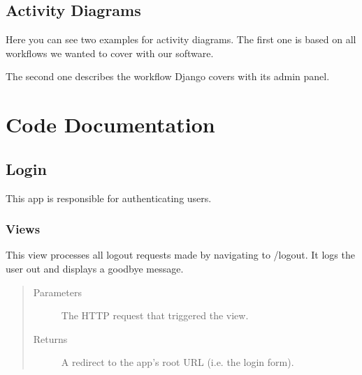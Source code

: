 \documentclass[letterpaper,10pt,english]{sphinxmanual}
\begin{document}


\section{Activity Diagrams}
\label{\detokenize{masterDeveloperDoc:activity-diagrams}}
Here you can see two examples for activity diagrams. The first one is based
on all workflows we wanted to cover with our software.


The second one describes the workflow Django covers with its admin panel.



\chapter{Code Documentation}
\label{\detokenize{masterCodeDoc:code-documentation}}\label{\detokenize{masterCodeDoc::doc}}

\section{Login}
\label{\detokenize{masterCodeDoc:login}}
This app is responsible for authenticating users.


\subsection{Views}
\label{\detokenize{masterCodeDoc:module-login.views}}\label{\detokenize{masterCodeDoc:views}}

\begin{fulllineitems}
\label{\detokenize{masterCodeDoc:login.views.logout_request}}
This view processes all logout requests made by navigating to /logout. It logs the user out and displays a goodbye message.
\begin{quote}\begin{description}
\item[{Parameters}] \leavevmode
{} \textendash{} The HTTP request that triggered the view.

\item[{Returns}] \leavevmode
A redirect to the app’s root URL (i.e. the login form).

\end{description}\end{quote}

\end{fulllineitems}
\end{document}
